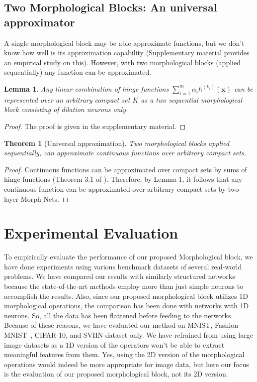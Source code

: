 \documentclass{bmvc2k}
\newtheorem{lemma}{Lemma}
\newtheorem{theorem}{Theorem}
\def\vx{{\bm{x}}}
\begin{document}
\subsection{Two Morphological Blocks: An universal approximator}
A single morphological block may be able approximate functions, but we don't know how well is its approximation capability (Supplementary material provides an empirical study on this). However, with two morphological blocks (applied sequentially) any function can be approximated. 
\begin{lemma}
Any linear combination of hinge functions $\sum_{i = 1}^m \alpha_i h^{(k_i)}(\vx)$ can be represented over an arbitrary compact set $K$ as a two sequential morphological block consisting of dilation neurons only.
\end{lemma} 
\begin{proof}
The proof is given in the supplementary material.
\end{proof}
\begin{theorem}[Universal approximation]
Two morphological blocks applied sequentially, can approximate continuous functions over arbitrary compact sets.
\end{theorem}
\begin{proof}
Continuous functions can be approximated over compact sets by sums of hinge functions (Theorem 3.1 of \cite{breiman1993hinging}). Therefore, by Lemma 1, it follows that any continuous function can be approximated over arbitrary compact sets by two-layer Morph-Nets.
\end{proof}





\section{Experimental Evaluation}
\label{sec:results}
To empirically evaluate the performance of our proposed Morphological block, we have done experiments using various benchmark datasets of several real-world problems. We have compared our results with similarly structured networks because the state-of-the-art methods employ more than just simple neurons to accomplish the results. Also, since our proposed morphological block utilizes 1D morphological operations, the comparison has been done with networks with 1D neurons. So, all the data has been flattened before feeding to the networks. Because of these reasons, we have evaluated our method on MNIST, Fashion-MNIST~\cite{xiao2017fashion}, CIFAR-10, and SVHN dataset only. We have refrained from using large image datasets as a 1D version of the operators won't be able to extract meaningful features from them. Yes, using the 2D version of the morphological operations would indeed be more appropriate for image data, but here our focus is the evaluation of our proposed morphological block, not its 2D version. 
\end{document}
